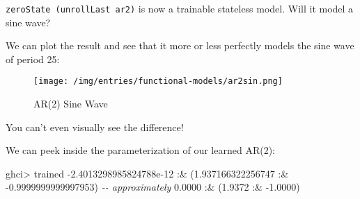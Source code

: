 \documentclass[]{article}
\newenvironment{Shaded}{}{}
\newcommand{\CommentTok}[1]{\textcolor[rgb]{0.38,0.63,0.69}{\textit{#1}}}
\newcommand{\DataTypeTok}[1]{\textcolor[rgb]{0.56,0.13,0.00}{#1}}
\newcommand{\DecValTok}[1]{\textcolor[rgb]{0.25,0.63,0.44}{#1}}
\newcommand{\FloatTok}[1]{\textcolor[rgb]{0.25,0.63,0.44}{#1}}
\newcommand{\FunctionTok}[1]{\textcolor[rgb]{0.02,0.16,0.49}{#1}}
\newcommand{\KeywordTok}[1]{\textcolor[rgb]{0.00,0.44,0.13}{\textbf{#1}}}
\newcommand{\NormalTok}[1]{#1}
\newcommand{\OperatorTok}[1]{\textcolor[rgb]{0.40,0.40,0.40}{#1}}
\newcommand{\OtherTok}[1]{\textcolor[rgb]{0.00,0.44,0.13}{#1}}
\begin{document}
\texttt{zeroState\ (unrollLast\ ar2)} is now a trainable stateless model. Will
it model a sine wave?

\begin{Shaded}
\end{Shaded}

We can plot the result and see that it more or less perfectly models the sine
wave of period 25:

\begin{figure}
\centering
\texttt{[image: /img/entries/functional-models/ar2sin.png]}
\caption{AR(2) Sine Wave}
\end{figure}

You can't even visually see the difference!

We can peek inside the parameterization of our learned AR(2):

\begin{Shaded}
\begin{Highlighting}[]
\NormalTok{ghci}\OperatorTok{>}\NormalTok{ trained}
\OperatorTok{{-}}\FloatTok{2.4013298985824788e{-}12} \OperatorTok{:\&}\NormalTok{ (}\FloatTok{1.937166322256747} \OperatorTok{:\&} \OperatorTok{{-}}\FloatTok{0.9999999999997953}\NormalTok{)}
\CommentTok{{-}{-} approximately}
\FloatTok{0.0000} \OperatorTok{:\&}\NormalTok{ (}\FloatTok{1.9372} \OperatorTok{:\&} \OperatorTok{{-}}\FloatTok{1.0000}\NormalTok{)}
\end{Highlighting}
\end{Shaded}
\end{document}
